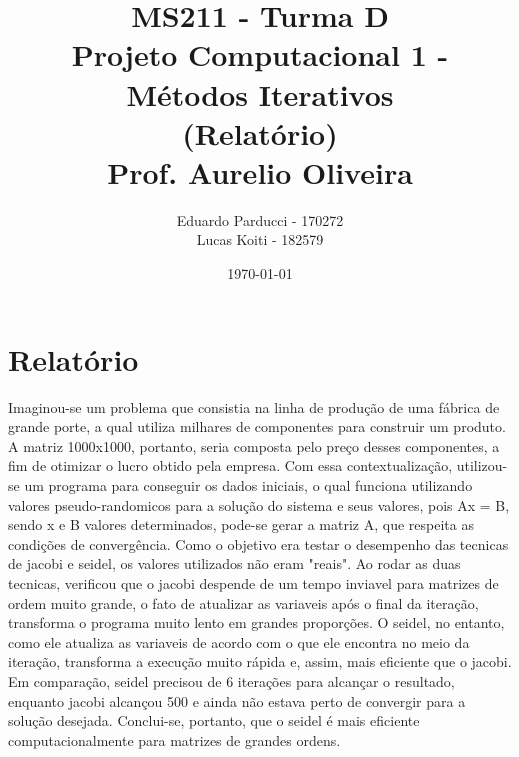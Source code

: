 \documentclass{article}
\title{
    MS211 - Turma D\\
    \large Projeto Computacional 1 - Métodos Iterativos\\
    \large (Relatório)\\
    \large Prof. Aurelio Oliveira
}
\author{Eduardo Parducci - 170272\\Lucas Koiti      - 182579\\}
\date{\today}
\begin{document}
    \maketitle
    \newpage

    \section{Relatório}
      Imaginou-se um problema que consistia na linha de produção de uma fábrica de
      grande porte, a qual utiliza milhares de componentes para construir um produto.
      A matriz 1000x1000, portanto, seria composta pelo preço desses componentes, a fim
      de otimizar o lucro obtido pela empresa. Com essa contextualização, utilizou-se
      um programa para conseguir os dados iniciais, o qual funciona
      utilizando valores pseudo-randomicos para a solução do sistema e seus valores,
      pois Ax = B, sendo x e B valores determinados, pode-se gerar a matriz A, que
      respeita as condições de convergência. Como o objetivo era testar o desempenho
      das tecnicas de jacobi e seidel, os valores utilizados não eram "reais".
        Ao rodar as duas tecnicas, verificou que o jacobi despende de um tempo inviavel
      para matrizes de ordem muito grande, o fato de atualizar as variaveis após
      o final da iteração, transforma o programa muito lento em grandes proporções.
      O seidel, no entanto, como ele atualiza as variaveis de acordo com o que ele
      encontra no meio da iteração, transforma a execução muito rápida e, assim, mais
      eficiente que o jacobi. Em comparação, seidel precisou de 6 iterações para
      alcançar o resultado, enquanto jacobi alcançou 500 e ainda não estava perto
      de convergir para a solução desejada. Conclui-se, portanto, que o seidel é mais
      eficiente computacionalmente para matrizes de grandes ordens.
\end{document}
